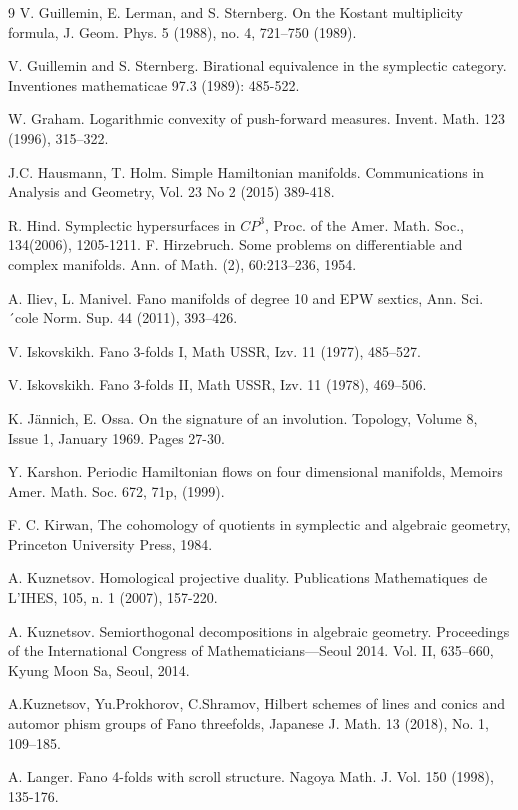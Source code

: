\documentclass[12pt]{article}
\begin{document}
\begin{thebibliography}{9}
  V. Guillemin, E. Lerman, and S. Sternberg. On the Kostant multiplicity formula,
 J. Geom. Phys. 5 (1988), no. 4, 721–750 (1989).

 V. Guillemin and S. Sternberg. Birational equivalence in the symplectic category. Inventiones mathematicae 97.3 (1989): 485-522.

  W. Graham. Logarithmic convexity of push-forward measures. Invent. Math. 123 (1996), 315–322.

 J.C. Hausmann, T. Holm. Simple Hamiltonian manifolds. Communications in Analysis and Geometry, Vol. 23 No 2 (2015) 389-418.

 R. Hind.  Symplectic hypersurfaces in $CP^3$, Proc. of the Amer. Math. Soc., 134(2006), 1205-1211.
 F. Hirzebruch. Some problems on differentiable and complex manifolds. Ann. of Math. (2), 60:213–236, 1954.

 A. Iliev, L. Manivel. Fano manifolds of degree 10 and EPW sextics, Ann. Sci. ´cole Norm. Sup. 44 (2011), 393–426.

 V. Iskovskikh. Fano 3-folds I, Math USSR, Izv. 11 (1977), 485–527.

 V. Iskovskikh. Fano 3-folds II, Math USSR, Izv. 11 (1978), 469–506.

 K. J\"{a}nnich, E. Ossa. On the signature of an involution. Topology, Volume 8, Issue 1, January 1969. Pages 27-30.

 Y. Karshon. Periodic Hamiltonian flows on four dimensional manifolds, Memoirs
 Amer. Math. Soc. 672, 71p, (1999).

 F. C. Kirwan, The cohomology of quotients in symplectic and algebraic geometry, Princeton University Press, 1984.

  A. Kuznetsov. Homological projective duality. Publications Mathematiques de L'IHES, 105, n. 1 (2007), 157-220.

 A. Kuznetsov. Semiorthogonal decompositions in algebraic geometry. Proceedings of the International Congress of Mathematicians—Seoul 2014. Vol. II, 635–660, Kyung Moon Sa, Seoul, 2014.

 A.Kuznetsov, Yu.Prokhorov, C.Shramov, Hilbert schemes of lines and conics and automor
phism groups of Fano threefolds, Japanese J. Math. 13 (2018), No. 1, 109–185.

 A. Langer. Fano 4-folds with scroll structure.
 Nagoya Math. J.
 Vol. 150 (1998), 135-176.


\end{thebibliography}
\end{document}
